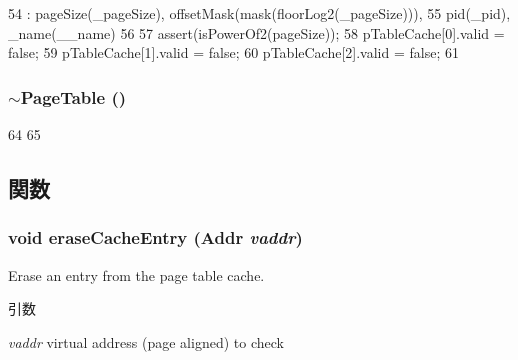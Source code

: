 \begin{DoxyCode}
54     : pageSize(_pageSize), offsetMask(mask(floorLog2(_pageSize))),
55       pid(_pid), _name(__name)
56 {
57     assert(isPowerOf2(pageSize));
58     pTableCache[0].valid = false;
59     pTableCache[1].valid = false;
60     pTableCache[2].valid = false;
61 }
\end{DoxyCode}
\hypertarget{classPageTable_ac8d0a10aebf4985568764273ad64d267}{
\subsubsection[{$\sim$PageTable}]{\setlength{\rightskip}{0pt plus 5cm}$\sim${\bf PageTable} ()}}
\label{classPageTable_ac8d0a10aebf4985568764273ad64d267}



\begin{DoxyCode}
64 {
65 }
\end{DoxyCode}


\subsection{関数}
\hypertarget{classPageTable_a7a34214b4d368d09f3dee2ee3670b520}{
\subsubsection[{eraseCacheEntry}]{\setlength{\rightskip}{0pt plus 5cm}void eraseCacheEntry ({\bf Addr} {\em vaddr})}}
\label{classPageTable_a7a34214b4d368d09f3dee2ee3670b520}
Erase an entry from the page table cache. 
\begin{DoxyParams}{引数}
\item[{\em vaddr}]virtual address (page aligned) to check \end{DoxyParams}



